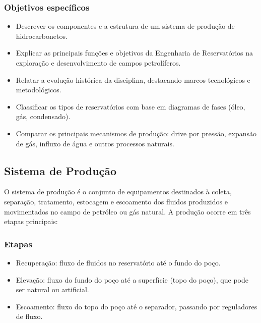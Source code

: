 \documentclass[11pt,a4paper]{article}
\begin{document}
\subsubsection{Objetivos específicos}
\begin{itemize}
\item Descrever os componentes e a estrutura de um sistema de produção de hidrocarbonetos.
\item Explicar as principais funções e objetivos da Engenharia de Reservatórios na exploração e desenvolvimento de campos petrolíferos.
\item Relatar a evolução histórica da disciplina, destacando marcos tecnológicos e metodológicos.
\item Classificar os tipos de reservatórios com base em diagramas de fases (óleo, gás, condensado).
\item Comparar os principais mecanismos de produção: drive por pressão, expansão de gás, influxo de água e outros processos naturais.
\end{itemize}

\subsection{Sistema de Produção}
 O sistema de produção é o conjunto de equipamentos destinados à coleta, separação, tratamento, estocagem e escoamento dos fluidos produzidos e movimentados no campo de petróleo ou gás natural. A produção ocorre em três etapas principais:

\subsubsection{Etapas}
\begin{itemize}
\item Recuperação: fluxo de fluidos no reservatório até o fundo do poço.
\item Elevação: fluxo do fundo do poço até a superfície (topo do poço), que pode ser natural ou artificial.
\item Escoamento: fluxo do topo do poço até o separador, passando por reguladores de fluxo.
\end{itemize}
\end{document}
